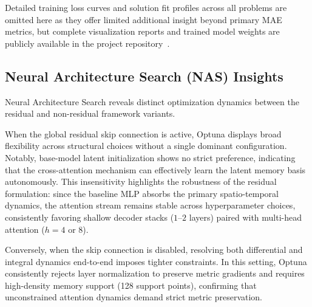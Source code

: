 Detailed training loss curves and solution fit profiles across all problems are omitted here as they offer limited additional insight beyond primary MAE metrics, but complete visualization reports and trained model weights are publicly available in the project repository~\cite{crosspinn_drive2026}.

\begin{table}[H]
\centering
{}
\caption{Mean Absolute Error (MAE) Benchmark Comparison}
\label{tab:results_mae}
\end{table}

\subsection{Neural Architecture Search (NAS) Insights}
Neural Architecture Search reveals distinct optimization dynamics between the residual and non-residual framework variants. 

When the global residual skip connection is active, Optuna displays broad flexibility across structural choices without a single dominant configuration. Notably, base-model latent initialization shows no strict preference, indicating that the cross-attention mechanism can effectively learn the latent memory basis autonomously. This insensitivity highlights the robustness of the residual formulation: since the baseline MLP absorbs the primary spatio-temporal dynamics, the attention stream remains stable across hyperparameter choices, consistently favoring shallow decoder stacks ($1$--$2$ layers) paired with multi-head attention ($h = 4$ or $8$).

Conversely, when the skip connection is disabled, resolving both differential and integral dynamics end-to-end imposes tighter constraints. In this setting, Optuna consistently rejects layer normalization to preserve metric gradients and requires high-density memory support (128 support points), confirming that unconstrained attention dynamics demand strict metric preservation.
